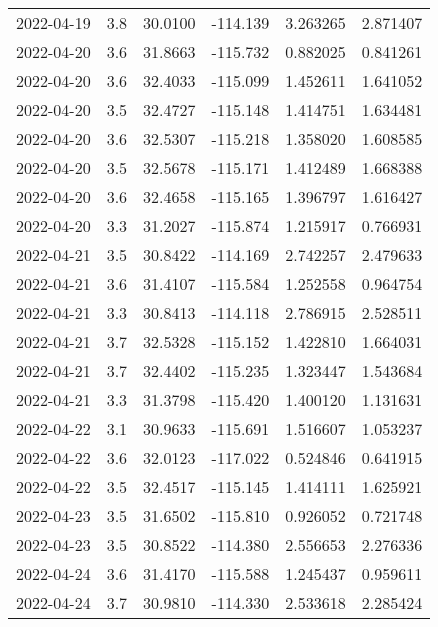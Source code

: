 \begin{tabular}{lrrrrr}
2022-04-19 &       3.8 &  30.0100 &  -114.139 &         3.263265 &         2.871407 \\
2022-04-20 &       3.6 &  31.8663 &  -115.732 &         0.882025 &         0.841261 \\
2022-04-20 &       3.6 &  32.4033 &  -115.099 &         1.452611 &         1.641052 \\
2022-04-20 &       3.5 &  32.4727 &  -115.148 &         1.414751 &         1.634481 \\
2022-04-20 &       3.6 &  32.5307 &  -115.218 &         1.358020 &         1.608585 \\
2022-04-20 &       3.5 &  32.5678 &  -115.171 &         1.412489 &         1.668388 \\
2022-04-20 &       3.6 &  32.4658 &  -115.165 &         1.396797 &         1.616427 \\
2022-04-20 &       3.3 &  31.2027 &  -115.874 &         1.215917 &         0.766931 \\
2022-04-21 &       3.5 &  30.8422 &  -114.169 &         2.742257 &         2.479633 \\
2022-04-21 &       3.6 &  31.4107 &  -115.584 &         1.252558 &         0.964754 \\
2022-04-21 &       3.3 &  30.8413 &  -114.118 &         2.786915 &         2.528511 \\
2022-04-21 &       3.7 &  32.5328 &  -115.152 &         1.422810 &         1.664031 \\
2022-04-21 &       3.7 &  32.4402 &  -115.235 &         1.323447 &         1.543684 \\
2022-04-21 &       3.3 &  31.3798 &  -115.420 &         1.400120 &         1.131631 \\
2022-04-22 &       3.1 &  30.9633 &  -115.691 &         1.516607 &         1.053237 \\
2022-04-22 &       3.6 &  32.0123 &  -117.022 &         0.524846 &         0.641915 \\
2022-04-22 &       3.5 &  32.4517 &  -115.145 &         1.414111 &         1.625921 \\
2022-04-23 &       3.5 &  31.6502 &  -115.810 &         0.926052 &         0.721748 \\
2022-04-23 &       3.5 &  30.8522 &  -114.380 &         2.556653 &         2.276336 \\
2022-04-24 &       3.6 &  31.4170 &  -115.588 &         1.245437 &         0.959611 \\
2022-04-24 &       3.7 &  30.9810 &  -114.330 &         2.533618 &         2.285424 \\

\end{tabular}
